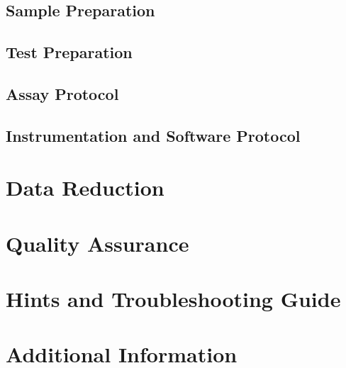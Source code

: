 \subsection{Sample Preparation}
\subsection{Test Preparation}
\subsection{Assay Protocol}
\subsection{Instrumentation and Software Protocol}

\section{Data Reduction}

\section{Quality Assurance}

\section{Hints and Troubleshooting Guide}

\section{Additional Information}